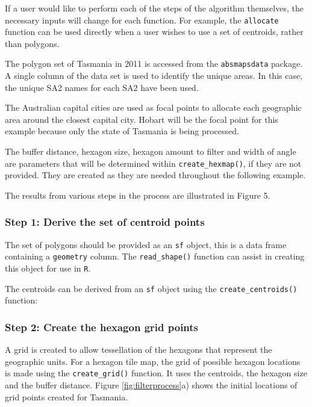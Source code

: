 If a user would like to perform each of the steps of the algorithm
themselves, the necessary inputs will change for each function. For
example, the \texttt{allocate} function can be used directly when a user
wishes to use a set of centroids, rather than polygons.

The polygon set of Tasmania in 2011 is accessed from the
\texttt{absmapsdata} package. A single column of the data set is used to
identify the unique areas. In this case, the unique SA2 names for each
SA2 have been used.

The Australian capital cities are used as focal points to allocate each
geographic area around the closest capital city. Hobart will be the
focal point for this example because only the state of Tasmania is being
processed.

The buffer distance, hexagon size, hexagon amount to filter and width of
angle are parameters that will be determined within
\texttt{create\_hexmap()}, if they are not provided. They are created as
they are needed throughout the following example.

The results from various steps in the process are illustrated in Figure
5.

\hypertarget{step-1-derive-the-set-of-centroid-points}{%
\subsubsection{Step 1: Derive the set of centroid
points}\label{step-1-derive-the-set-of-centroid-points}}

The set of polygons should be provided as an \texttt{sf} object, this is
a data frame containing a \texttt{geometry} column. The
\texttt{read\_shape()} function can assist in creating this object for
use in \texttt{R}.

The centroids can be derived from an \texttt{sf} object using the
\texttt{create\_centroids()} function:

\hypertarget{step-2-create-the-hexagon-grid-points}{%
\subsubsection{Step 2: Create the hexagon grid
points}\label{step-2-create-the-hexagon-grid-points}}

A grid is created to allow tessellation of the hexagons that represent
the geographic units. For a hexagon tile map, the grid of possible
hexagon locations is made using the \texttt{create\_grid()} function. It
uses the centroids, the hexagon size and the buffer distance. Figure
\ref{fig:filterprocess}a) shows the initial locations of grid points
created for Tasmania.

